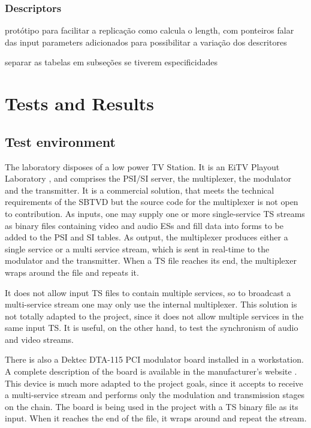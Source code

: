 \documentclass[
	12pt,				%
	openright,			%
	twoside,			%
	a4paper,			%
	brazil,
	french,				%
	english
	]{abntex2}
\begin{document}
\subsection{Descriptors}
protótipo para facilitar a replicação
como calcula o length, com ponteiros
falar das input parameters adicionados para possibilitar a variação dos descritores

separar as tabelas em subseções se tiverem especificidades


\chapter{Tests and Results}
%
\section{Test environment}

The laboratory disposes of a low power TV Station. It is an EiTV Playout Laboratory \cite{eitv}, and comprises the PSI/SI server, the multiplexer, the modulator and the transmitter. It is a commercial solution, that meets the technical requirements of the SBTVD but the source code for the multiplexer is not open to contribution. As inputs, one may supply one or more single-service TS streams as binary files containing video and audio ESs and fill data into forms to be added to the PSI and SI tables. As output, the multiplexer produces either a single service or a multi service stream, which is sent in real-time to the modulator and the transmitter. When a TS file reaches its end, the multiplexer wraps around the file and repeats it.

It does not allow input TS files to contain multiple services, so to broadcast a multi-service stream one may only use the internal multiplexer. This solution is not totally adapted to the project, since it does not allow multiple services in the same input TS. It is useful, on the other hand, to test the synchronism of audio and video streams.

There is also a Dektec DTA-115 PCI modulator board installed in a workstation. A complete description of the board is available in the manufacturer's website \cite{dektec}. This device is much more adapted to the project goals, since it accepts to receive a multi-service stream and performs only the modulation and transmission stages on the chain. The board is being used in the project with a TS binary file as its input. When it reaches the end of the file, it wraps around and repeat the stream.
\end{document}
